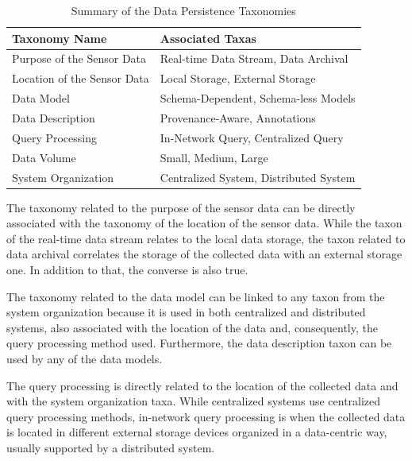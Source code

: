 \begin{table}[!b]
    \label{tab:taxonomies-list-summary}
    \begin{center}
        \begin{tabular}{|p{170pt}|p{250pt}|}\hline 
        \textbf{Taxonomy Name} & \textbf{Associated Taxas}\\\hline 
        Purpose of the Sensor Data & Real-time Data Stream, Data Archival \\\hline 
        Location of the Sensor Data & Local Storage, External Storage\\\hline
        Data Model & Schema-Dependent, Schema-less Models\\\hline 
        Data Description & Provenance-Aware, Annotations\\\hline
        Query Processing & In-Network Query, Centralized Query\\\hline 
        Data Volume & Small, Medium, Large\\\hline
        System Organization & Centralized System, Distributed System\\\hline
        \end{tabular}
    \end{center}
    \caption{Summary of the Data Persistence Taxonomies}
\end{table}

The taxonomy related to the purpose of the sensor data can be directly associated 
with the taxonomy of the location of the sensor data. While the taxon of the 
real-time data stream relates to the local data storage, the taxon related to
data archival correlates the storage of the collected data with an external
storage one. In addition to that, the converse is also true.

The taxonomy related to the data model can be linked to any taxon from the 
system organization because it is used in both centralized and distributed
systems, also associated with the location of the data and, consequently, the
query processing method used. Furthermore, the data description taxon can be
used by any of the data models. 

The query processing is directly related to the location of the collected data
and with the system organization taxa. While centralized systems use centralized
query processing methods, in-network query processing is when the collected
data is located in different external storage devices organized in a
data-centric way, usually supported by a distributed system.

